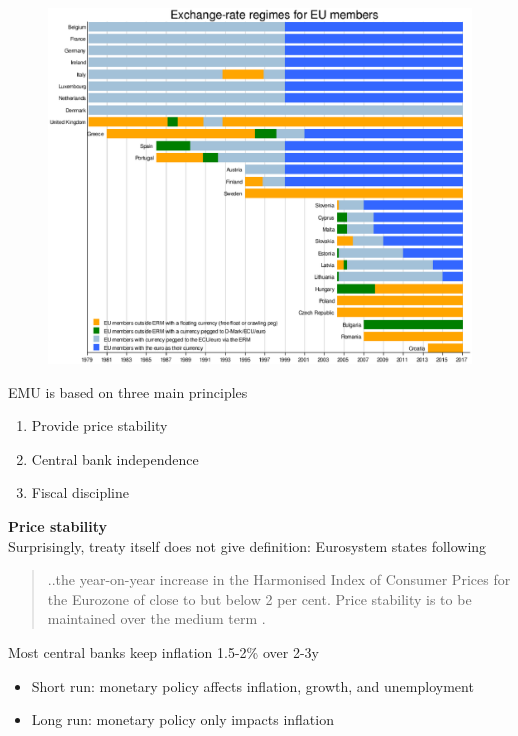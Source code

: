 \documentclass{beamer}
\begin{document}
\begin{frame}
  \begin{figure}
    \includegraphics[scale=.4]{erm.eps}
  \end{figure}
\end{frame}

\begin{frame}
  EMU is based on three main principles
  \begin{enumerate}
    \item Provide price stability
    \item Central bank independence
    \item Fiscal discipline  
\end{enumerate}
\end{frame}

\begin{frame}
  \textbf{Price stability}\\
  Surprisingly, treaty itself does not give definition: Eurosystem states following
  \begin{quote}
    ..the year-on-year increase in the Harmonised Index of Consumer Prices for the Eurozone of close to but below 2 per cent. Price stability is to be maintained over the medium term .
  \end{quote}
   \medskip
   Most central banks keep inflation 1.5-2\% over 2-3y
   \begin{itemize}
     \item Short run: monetary policy affects inflation, growth, and unemployment
     \item Long run: monetary policy only impacts inflation     
   \end{itemize}
\end{frame}
\end{document}
